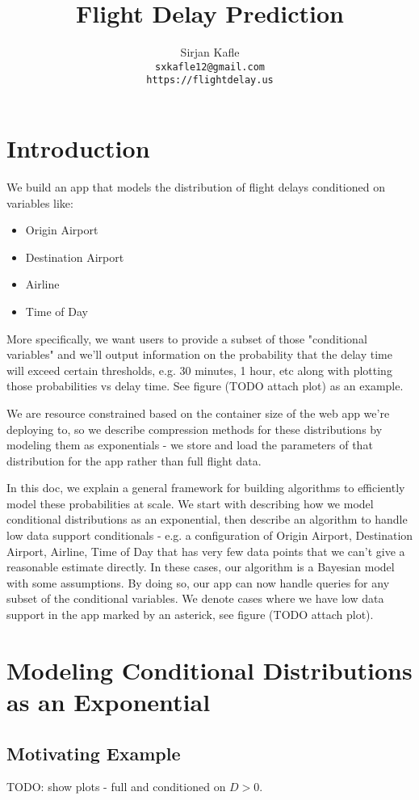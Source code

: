 \documentclass{article}
\title{Flight Delay Prediction}
\author{%
  Sirjan Kafle \\
  \texttt{sxkafle12@gmail.com} \\
  \texttt{https://flightdelay.us}
}
\begin{document}
\maketitle

\section{Introduction}
We build an app that models the distribution of flight delays conditioned on variables like:
\begin{itemize}
  \item Origin Airport
  \item Destination Airport
  \item Airline
  \item Time of Day
\end{itemize}

More specifically, we want users to provide a subset of those "conditional variables" and we'll output information on the probability that the delay
time will exceed certain thresholds, e.g. 30 minutes, 1 hour, etc along with plotting those probabilities vs delay time. See figure (TODO attach plot)
as an example.

We are resource constrained based on the container size of the web app we're deploying to, so we describe compression methods for these distributions by modeling them as exponentials - we store
and load the parameters of that distribution for the app rather than full flight data.

In this doc, we explain a general framework for building algorithms to efficiently model these probabilities at scale. We start with describing
how we model conditional distributions as an exponential, then describe an algorithm to handle low data support conditionals - e.g. a configuration
of Origin Airport, Destination Airport, Airline, Time of Day that has very few data points that we can't give a reasonable estimate directly. In 
these cases, our algorithm is a Bayesian model with some assumptions. By doing so, our app can now handle queries for any subset of the conditional
variables. We denote cases where we have low data support in the app marked by an asterick, see figure (TODO attach plot).

\section{Modeling Conditional Distributions as an Exponential}
\subsection{Motivating Example}
TODO: show plots - full and conditioned on $D > 0$.
\end{document}
